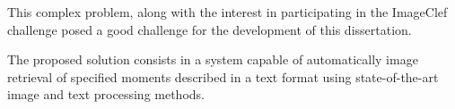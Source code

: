      \TEXT{}
     {This complex problem, along with the interest in participating in the ImageClef challenge posed a good challenge for the development of this dissertation.}

     \TEXT{}
     {The proposed solution consists in a system capable of automatically image retrieval of specified moments described in a text format using state-of-the-art image and text processing methods.}
\EndTitlePage
\titlepage\ \endtitlepage %
